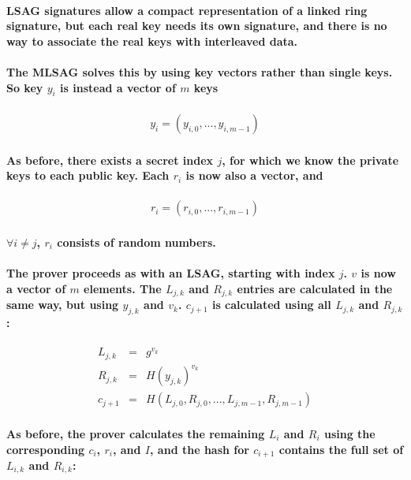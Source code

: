 \documentclass{article}
\begin{document}
\paragraph{LSAG signatures allow a compact representation of a linked ring signature, but each real key needs its own signature, and there is no way to associate the real keys with interleaved data.}

\paragraph{The MLSAG solves this by using key vectors rather than single keys.  So key $y_i$ is instead a vector of $m$ keys}

\begin{eqnarray}
  y_i = (y_{i,0}, ..., y_{i,m-1})
\end{eqnarray}

\paragraph{As before, there exists a secret index $j$, for which we know the private keys to each public key.  Each $r_i$ is now also a vector, and}

\begin{eqnarray}
  r_i = (r_{i,0}, ..., r_{i,m-1})
\end{eqnarray}

\paragraph{$\forall i \ne j$, $r_i$ consists of random numbers.}

\paragraph{The prover proceeds as with an LSAG, starting with index $j$.  $v$ is now a vector of $m$ elements.  The $L_{j,k}$ and $R_{j,k}$ entries are calculated in the same way, but using $y_{j,k}$ and $v_k$.  $c_{j+1}$ is calculated using all $L_{j,k}$ and $R_{j,k}$:}

\begin{eqnarray}
  L_{j,k} &=& g^{v_k}\\
  R_{j,k} &=& H(y_{j,k})^{v_k}\\
  c_{j+1} &=& H(L_{j,0}, R_{j,0}, ..., L_{j,m-1}, R_{j,m-1})
\end{eqnarray}

\paragraph{As before, the prover calculates the remaining $L_i$ and $R_i$ using the corresponding $c_i$, $r_i$, and $I$, and the hash for $c_{i+1}$ contains the full set of $L_{i,k}$ and $R_{i,k}$:}
\end{document}
